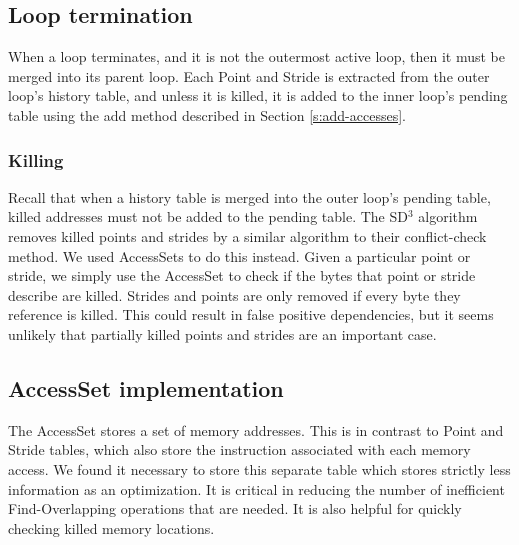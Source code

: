 \documentclass[12pt,twoside]{reedthesis}
\begin{document}
			
		\subsection{Loop termination}
		
			When a loop terminates, and it is not the outermost active loop, then it must be merged into its parent loop. Each Point and Stride is extracted from the outer loop's history table, and unless it is killed, it is added to the inner loop's pending table using the add method described in Section \ref{s:add-accesses}. 
		
		\subsubsection{Killing}
		
			Recall that when a history table is merged into the outer loop's pending table, killed addresses must not be added to the pending table. 
			The SD$^3$ algorithm removes killed points and strides by a similar algorithm to their conflict-check method. We used AccessSets to do this instead. Given a particular point or stride, we simply use the AccessSet to check if the bytes that point or stride describe are killed. Strides and points are only removed if every byte they reference is killed. This could result in false positive dependencies, but it seems unlikely that partially killed points and strides are an important case. 
%			
%			
		\subsection{AccessSet implementation}\label{s:access-set}
			
			The AccessSet stores a set of memory addresses. This is in contrast to Point and Stride tables, which also store the instruction associated with each memory access. We found it necessary to store this separate table which stores strictly less information as an optimization. It is critical in reducing the number of inefficient Find-Overlapping operations that are needed. It is also helpful for quickly checking killed memory locations. 
			
\end{document}
